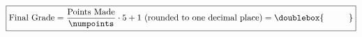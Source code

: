 \documentclass[11pt]{exam}
\begin{document}
\begin{center}
\gradetable[h] %
\end{center}





















\vfill

\[
\fbox{$
\text{Final Grade} = \dfrac{\text{Points Made}}{\numpoints}\cdot 5+1 \text{ (rounded to one decimal place)}=\doublebox{\mbox{\hspace*{1cm}}}
$}
\]
\vfill















\newpage %

%
%
%









\newcommand{\iu}{{\bf i}}
\end{document}
